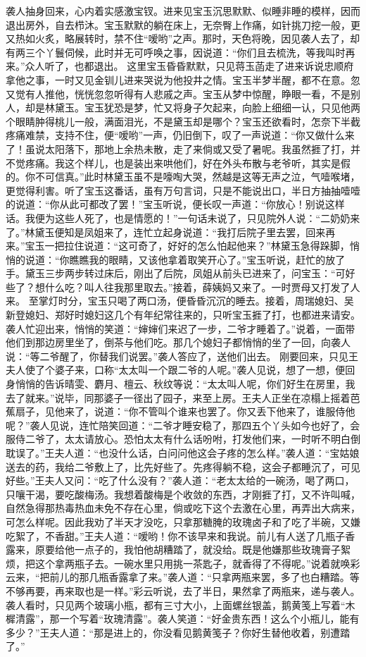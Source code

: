 \documentclass[12pt,oneside]{book}
\begin{document}
袭人抽身回来，心内着实感激宝钗。进来见宝玉沉思默默、似睡非睡的模样，因而退出房外，自去栉沐。宝玉默默的躺在床上，无奈臀上作痛，如针挑刀挖一般，更又热如火炙，略展转时，禁不住“嗳哟”之声。那时，天色将晚，因见袭人去了，却有两三个丫鬟伺候，此时并无可呼唤之事，因说道：“你们且去梳洗，等我叫时再来。”众人听了，也都退出。
这里宝玉昏昏默默，只见蒋玉菡走了进来诉说忠顺府拿他之事，一时又见金钏儿进来哭说为他投井之情。宝玉半梦半醒，都不在意。忽又觉有人推他，恍恍忽忽听得有人悲戚之声。宝玉从梦中惊醒，睁眼一看，不是别人，却是林黛玉。宝玉犹恐是梦，忙又将身子欠起来，向脸上细细一认，只见他两个眼睛肿得桃儿一般，满面泪光，不是黛玉却是哪个？宝玉还欲看时，怎奈下半截疼痛难禁，支持不住，便“嗳哟”一声，仍旧倒下，叹了一声说道：“你又做什么来了！虽说太阳落下，那地上余热未散，走了来倘或又受了暑呢。我虽然捱了打，并不觉疼痛。我这个样儿，也是装出来哄他们，好在外头布散与老爷听，其实是假的。你不可信真。”此时林黛玉虽不是嚎啕大哭，然越是这等无声之泣，气噎喉堵，更觉得利害。听了宝玉这番话，虽有万句言词，只是不能说出口，半日方抽抽噎噎的说道：“你从此可都改了罢！”宝玉听说，便长叹一声道：“你放心！别说这样话。我便为这些人死了，也是情愿的！”一句话未说了，只见院外人说：“二奶奶来了。”林黛玉便知是凤姐来了，连忙立起身说道：“我打后院子里去罢，回来再来。”宝玉一把拉住说道：“这可奇了，好好的怎么怕起他来？”林黛玉急得跺脚，悄悄的说道：“你瞧瞧我的眼睛，又该他拿着取笑开心了。”宝玉听说，赶忙的放了手。黛玉三步两步转过床后，刚出了后院，凤姐从前头已进来了，问宝玉：“可好些了？想什么吃？叫人往我那里取去。”接着，薛姨妈又来了。一时贾母又打发了人来。
至掌灯时分，宝玉只喝了两口汤，便昏昏沉沉的睡去。接着，周瑞媳妇、吴新登媳妇、郑好时媳妇这几个有年纪常往来的，只听宝玉捱了打，也都进来请安。袭人忙迎出来，悄悄的笑道：“婶婶们来迟了一步，二爷才睡着了。”说着，一面带他们到那边房里坐了，倒茶与他们吃。那几个媳妇子都悄悄的坐了一回，向袭人说：“等二爷醒了，你替我们说罢。”袭人答应了，送他们出去。
刚要回来，只见王夫人使了个婆子来，口称“太太叫一个跟二爷的人呢。”袭人见说，想了一想，便回身悄悄的告诉晴雯、麝月、檀云、秋纹等说：“太太叫人呢，你们好生在房里，我去了就来。”说毕，同那婆子一径出了园子，来至上房。王夫人正坐在凉榻上摇着芭蕉扇子，见他来了，说道：“你不管叫个谁来也罢了。你又丢下他来了，谁服侍他呢？”袭人见说，连忙陪笑回道：“二爷才睡安稳了，那四五个丫头如今也好了，会服侍二爷了，太太请放心。恐怕太太有什么话吩咐，打发他们来，一时听不明白倒耽误了。”王夫人道：“也没什么话，白问问他这会子疼的怎么样。”袭人道：“宝姑娘送去的药，我给二爷敷上了，比先好些了。先疼得躺不稳，这会子都睡沉了，可见好些。”王夫人又问：“吃了什么没有？”袭人道：“老太太给的一碗汤，喝了两口，只嚷干渴，要吃酸梅汤。我想着酸梅是个收敛的东西，才刚捱了打，又不许叫喊，自然急得那热毒热血未免不存在心里，倘或吃下这个去激在心里，再弄出大病来，可怎么样呢。因此我劝了半天才没吃，只拿那糖腌的玫瑰卤子和了吃了半碗，又嫌吃絮了，不香甜。”王夫人道：“嗳哟！你不该早来和我说。前儿有人送了几瓶子香露来，原要给他一点子的，我怕他胡糟踏了，就没给。既是他嫌那些玫瑰膏子絮烦，把这个拿两瓶子去。一碗水里只用挑一茶匙子，就香得了不得呢。”说着就唤彩云来，“把前儿的那几瓶香露拿了来。”袭人道：“只拿两瓶来罢，多了也白糟踏。等不够再要，再来取也是一样。”彩云听说，去了半日，果然拿了两瓶来，递与袭人。袭人看时，只见两个玻璃小瓶，都有三寸大小，上面螺丝银盖，鹅黄笺上写着“木樨清露”，那一个写着“玫瑰清露”。袭人笑道：“好金贵东西！这么个小瓶儿，能有多少？”王夫人道：“那是进上的，你没看见鹅黄笺子？你好生替他收着，别遭踏了。”
\end{document}
